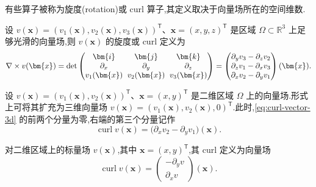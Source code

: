 \begin{definition}\label{def:rotation-curl}
有些算子被称为旋度(rotation)或 curl 算子,其定义取决于向量场所在的空间维数.

设 $v(\bm{x})=(v_1(\bm{x}),v_2(\bm{x}),v_3(\bm{x}))^\mathsf{T}$、$\bm{x}=(x,y,z)^\mathsf{T}$ 是区域 $\Omega\subset\mathbb{R}^3$ 上足够光滑的向量场,则 $v(\bm{x})$ 的旋度或 curl 定义为
\begin{equation}\label{eq:curl-vector-3d}
  \setlength{\arraycolsep}{3pt}%
  \nabla\times v(\bm{x})
  =\det\begin{pmatrix}
       \bm{i}&\bm{j}&\bm{k}\\
       \partial_x&\partial_y&\partial_z\\
       v_1(\bm{x})&v_2(\bm{x})&v_3(\bm{x})
      \end{pmatrix}
  =\begin{pmatrix}
       \partial_yv_3-\partial_zv_2\\
       \partial_zv_1-\partial_xv_3\\
       \partial_xv_2-\partial_yv_1
    \end{pmatrix}(\bm{x}).
\end{equation}

设 $v(\bm{x})=(v_1(\bm{x}),v_2(\bm{x}))^\mathsf{T}$、$\bm{x}=(x,y)^\mathsf{T}$ 是二维区域 $\Omega$ 上的向量场.形式上可将其扩充为三维向量场 $v(\bm{x})=(v_1(\bm{x}),v_2(\bm{x}),0)^\mathsf{T}$.此时,\cref{eq:curl-vector-3d} 的前两个分量为零,右端的第三个分量记作
\begin{equation}\label{eq:curl-vector-2d}
  \operatorname{curl}v(\bm{x})
    =\bigl(\partial_xv_2-\partial_yv_1\bigr)(\bm{x}).
\end{equation}

对二维区域上的标量场 $v(\bm{x})$,其中 $\bm{x}=(x,y)^\mathsf{T}$,其 curl 定义为向量场
\begin{equation}\label{eq:curl-scalar-2d}
  \operatorname{curl}v(\bm{x})
    =\begin{pmatrix}-\partial_yv\\[2pt]\partial_xv\end{pmatrix}(\bm{x}).
\end{equation}
\end{definition}


